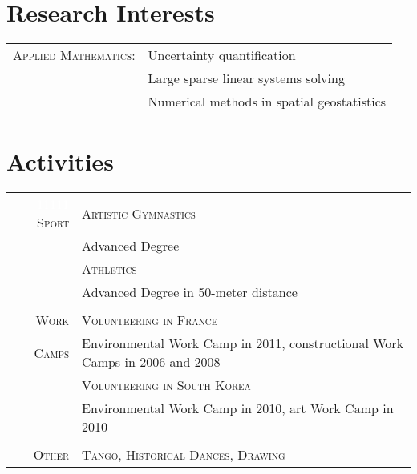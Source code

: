 \documentclass[a4paper,10pt]{article}
\begin{document}
\section{Research Interests}
\begin{tabular}{rp{13cm}}

\textsc{Applied Mathematics:} & Uncertainty quantification \\
& Large sparse linear systems solving \\
& Numerical methods in spatial geostatistics
\end{tabular}

\section{Activities}
\begin{tabular}{r|p{13cm}}
 \textcolor{white}{11111} \textsc{Sport}& \textsc{Artistic Gymnastics}\\
 & \footnotesize Advanced Degree\\
 & \textsc{Athletics}\\
 & \footnotesize Advanced Degree in 50-meter distance\\
 
\multicolumn{2}{c}{} \\
 
 \textsc{Work} & \textsc{Volunteering in France}\\
 \textsc{Camps} & \footnotesize Environmental Work Camp in 2011, constructional Work Camps in 2006 and 2008 \\
 & \textsc{Volunteering in South Korea}\\
 & \footnotesize Environmental Work Camp in 2010, art Work Camp in 2010 \\
 
\multicolumn{2}{c}{} \\
 
 \textsc{Other} & \textsc{Tango, Historical Dances, Drawing} \\
\end{tabular}
\end{document}

